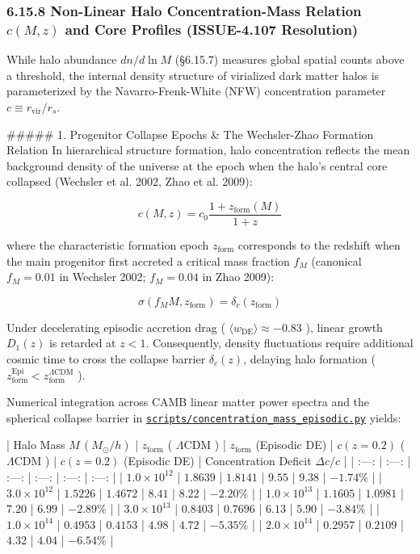 \documentclass[11pt,a4paper]{article}
\theoremstyle{definition}
\theoremstyle{remark}
\begin{document}
\subsubsection{6.15.8 Non-Linear Halo Concentration-Mass Relation $c(M, z)$ and Core Profiles (ISSUE-4.107 Resolution)}

While halo abundance $dn/d\ln M$ (\S 6.15.7) measures global spatial counts above a threshold, the internal density structure of virialized dark matter halos is parameterized by the Navarro-Frenk-White (NFW) concentration parameter $c \equiv r_{\text{vir}} / r_s$.

\#\#\#\#\# 1. Progenitor Collapse Epochs \& The Wechsler-Zhao Formation Relation
In hierarchical structure formation, halo concentration reflects the mean background density of the universe at the epoch when the halo's central core collapsed (Wechsler et al. 2002, Zhao et al. 2009):


\begin{equation}
c(M, z) = c_0 \frac{1 + z_{\text{form}}(M)}{1 + z}
\end{equation}


where the characteristic formation epoch $z_{\text{form}}$ corresponds to the redshift when the main progenitor first accreted a critical mass fraction $f_M$ (canonical $f_M = 0.01$ in Wechsler 2002; $f_M = 0.04$ in Zhao 2009):


\begin{equation}
\sigma(f_M M, z_{\text{form}}) = \delta_c(z_{\text{form}})
\end{equation}


Under decelerating episodic accretion drag ( $\langle w_{\text{DE}} \rangle \approx -0.83$ ), linear growth $D_1(z)$ is retarded at $z < 1$. Consequently, density fluctuations require additional cosmic time to cross the collapse barrier $\delta_c(z)$, delaying halo formation ( $z_{\text{form}}^{\text{Epi}} < z_{\text{form}}^{\Lambda\text{CDM}}$ ).

Numerical integration across CAMB linear matter power spectra and the spherical collapse barrier in \href{../../scripts/concentration_mass_episodic.py}{\texttt{scripts/concentration_mass_episodic.py}} yields:

| Halo Mass $M \, (M_\odot/h)$ | $z_{\text{form}}$ ( $\Lambda\text{CDM}$ ) | $z_{\text{form}}$ (Episodic DE) | $c(z=0.2)$ ( $\Lambda\text{CDM}$ ) | $c(z=0.2)$ (Episodic DE) | Concentration Deficit $\Delta c / c$ |
| :---: | :---: | :---: | :---: | :---: | :---: |
| $1.0 \times 10^{12}$ | $1.8639$ | $1.8141$ | $9.55$ | $9.38$ | \textbf{$-1.74\%$} |
| $3.0 \times 10^{12}$ | $1.5226$ | $1.4672$ | $8.41$ | $8.22$ | \textbf{$-2.20\%$} |
| $1.0 \times 10^{13}$ | $1.1605$ | $1.0981$ | $7.20$ | $6.99$ | \textbf{$-2.89\%$} |
| $3.0 \times 10^{13}$ | $0.8403$ | $0.7696$ | $6.13$ | $5.90$ | \textbf{$-3.84\%$} |
| $1.0 \times 10^{14}$ | $0.4953$ | $0.4153$ | $4.98$ | $4.72$ | \textbf{$-5.35\%$} |
| $2.0 \times 10^{14}$ | $0.2957$ | $0.2109$ | $4.32$ | $4.04$ | \textbf{$-6.54\%$} |
\end{document}
